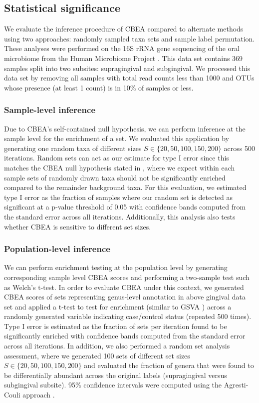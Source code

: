 \documentclass[10pt,letterpaper]{article}
\begin{document}
\subsection*{Statistical significance}
We evaluate the inference procedure of CBEA compared to alternate methods using two approaches: randomly sampled taxa sets and sample label permutation. These analyses were performed on the 16S rRNA gene sequencing of the oral microbiome from the Human Microbiome Project \cite{consortium2012, proctor2019}. This data set contains 369 samples split into two subsites: supragingival and subgingival. We processed this data set by removing all samples with total read counts less than 1000 and OTUs whose presence (at least 1 count) is in 10\% of samples or less.  

\subsubsection*{Sample-level inference} 
Due to CBEA's self-contained null hypothesis, we can perform inference at the sample level for the enrichment of a set. We evaluated this application by generating one random taxa of different sizes $S \in \{20, 50, 100, 150, 200\}$ across 500 iterations. Random sets can act as our estimate for type I error since this matches the CBEA null hypothesis stated in , where we expect within each sample sets of randomly drawn taxa should not be significantly enriched compared to the remainder background taxa. For this evaluation, we estimated type I error as the fraction of samples where our random set is detected as significant at a p-value threshold of 0.05 with confidence bands computed from the standard error across all iterations.  Additionally, this analysis also tests whether CBEA is sensitive to different set sizes.  

\subsubsection*{Population-level inference} 
We can perform enrichment testing at the population level by generating corresponding sample level CBEA scores and performing a two-sample test such as Welch's t-test. In order to evaluate CBEA under this context, we generated CBEA scores of sets representing genus-level annotation in above gingival data set \cite{consortium2012, proctor2019} and applied a t-test to test for enrichment (similar to GSVA \cite{hanzelmann2013}) across a randomly generated variable indicating case/control status (repeated 500 times). Type I error is estimated as the fraction of sets per iteration found to be significantly enriched with confidence bands computed from the standard error across all iterations. In addition, we also performed a random set analysis assessment, where we generated 100 sets of different set sizes $S \in \{20, 50, 100, 150, 200\}$ and evaluated the fraction of genera that were found to be differentially abundant across the original labels (supragingival versus subgingival subsite). 95\% confidence intervals were computed using the Agresti-Couli approach \cite{agresti1998}.  
\end{document}
